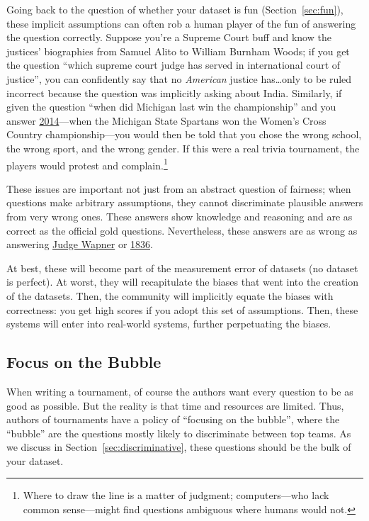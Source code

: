 Going back to the question of whether your dataset is fun (Section~\ref{sec:fun}), these implicit assumptions can often rob a human player of the fun of answering the question correctly.
Suppose you're a  Supreme Court buff and know the justices' biographies from Samuel Alito to William Burnham Woods; if you get the question ``which supreme court judge has served in international court of justice'', you can confidently say that no \emph{American} justice has\dots only to be ruled incorrect because the question was implicitly asking about India.
Similarly, if given the question ``when did Michigan last win the championship'' and you answer \underline{2014}---when the Michigan State Spartans won the Women's Cross Country championship---you would then be told that you chose the wrong school, the wrong sport, and the wrong gender.
If this were a real trivia tournament, the players would protest and complain.\footnote{Where to draw the line is a matter of judgment; computers---who lack common sense---might find questions ambiguous where humans would not.}

These issues are important not just from an abstract question of fairness; when questions make arbitrary assumptions, they cannot discriminate plausible answers from very wrong ones.
These answers show knowledge and reasoning and are as correct as the official gold questions.
Nevertheless, these answers are as wrong as answering \underline{Judge Wapner} or \underline{1836}.

At best, these will become part of the measurement error of datasets (no dataset is perfect). 
At worst, they will recapitulate the biases that went into the creation of the datasets.
Then, the community will implicitly equate the biases with correctness: you get high scores if you adopt this set of assumptions.
Then, these systems will enter into real-world systems, further perpetuating the biases.

\subsection{Focus on the Bubble}

When writing a tournament, of course the authors want every question to be as good as possible.
But the reality is that time and resources are limited.  
Thus, authors of tournaments have a policy of ``focusing on the bubble'', where the ``bubble'' are the questions mostly likely to discriminate between top teams.
As we discuss in Section~\ref{sec:discriminative}, these questions should be the bulk of your dataset.

